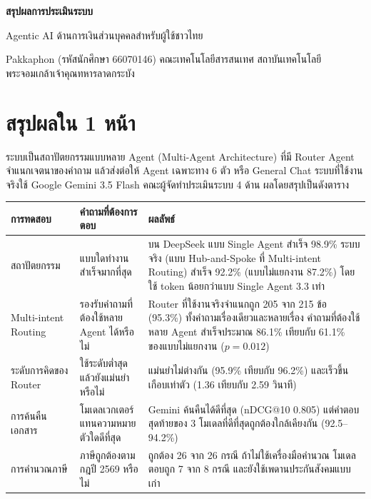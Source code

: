\documentclass[12pt,a4paper]{article}
\begin{document}
\begin{center}
{\LARGE\bfseries สรุปผลการประเมินระบบ\par}
\vspace{0.3em}
{\large Agentic AI ด้านการเงินส่วนบุคคลสำหรับผู้ใช้ชาวไทย\par}
\vspace{0.3em}
{\normalsize Pakkaphon (รหัสนักศึกษา 66070146) \quad คณะเทคโนโลยีสารสนเทศ สถาบันเทคโนโลยีพระจอมเกล้าเจ้าคุณทหารลาดกระบัง\par}
\end{center}

\section*{สรุปผลใน 1 หน้า}

ระบบเป็นสถาปัตยกรรมแบบหลาย Agent (Multi-Agent Architecture) ที่มี Router Agent จำแนกเจตนาของคำถาม แล้วส่งต่อให้ Agent เฉพาะทาง 6 ตัว หรือ General Chat ระบบที่ใช้งานจริงใช้ Google Gemini 3.5 Flash คณะผู้จัดทำประเมินระบบ 4 ด้าน ผลโดยสรุปเป็นดังตาราง

\begin{table}[H]
\centering
\small
\begin{tabular}{L{2.6cm}L{5.2cm}L{7.6cm}}
\toprule
\textbf{การทดสอบ} & \textbf{คำถามที่ต้องการตอบ} & \textbf{ผลลัพธ์} \\
\midrule
สถาปัตยกรรม & แบบใดทำงานสำเร็จมากที่สุด & บน DeepSeek แบบ Single Agent สำเร็จ 98.9\% ระบบจริง (แบบ Hub-and-Spoke ที่ Multi-intent Routing) สำเร็จ 92.2\% (แบบไม่แยกงาน 87.2\%) โดยใช้ token น้อยกว่าแบบ Single Agent 3.3 เท่า \\
Multi-intent Routing & รองรับคำถามที่ต้องใช้หลาย Agent ได้หรือไม่ & Router ที่ใช้งานจริงจำแนกถูก 205 จาก 215 ข้อ (95.3\%) ทั้งคำถามเรื่องเดียวและหลายเรื่อง คำถามที่ต้องใช้หลาย Agent สำเร็จประมาณ 86.1\% เทียบกับ 61.1\% ของแบบไม่แยกงาน ($p = 0.012$) \\
ระดับการคิดของ Router & ใช้ระดับต่ำสุดแล้วยังแม่นยำหรือไม่ & แม่นยำไม่ต่างกัน (95.9\% เทียบกับ 96.2\%) และเร็วขึ้นเกือบเท่าตัว (1.36 เทียบกับ 2.59 วินาที) \\
การค้นคืนเอกสาร & โมเดลเวกเตอร์แทนความหมายตัวใดดีที่สุด & Gemini ค้นคืนได้ดีที่สุด (nDCG@10 0.805) แต่คำตอบสุดท้ายของ 3 โมเดลที่ดีที่สุดถูกต้องใกล้เคียงกัน (92.5--94.2\%) \\
การคำนวณภาษี & ภาษีถูกต้องตามกฎปี 2569 หรือไม่ & ถูกต้อง 26 จาก 26 กรณี ถ้าไม่ใช้เครื่องมือคำนวณ โมเดลตอบถูก 7 จาก 8 กรณี และยังใช้เพดานประกันสังคมแบบเก่า \\
\bottomrule
\end{tabular}
\end{table}
\end{document}
